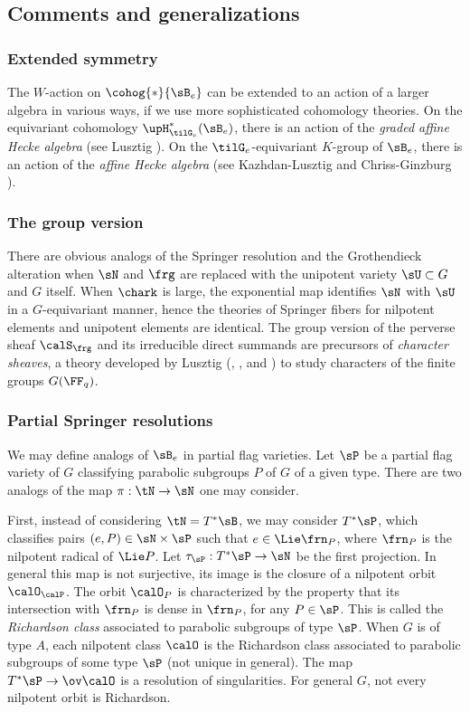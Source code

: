 \subsection{Comments and generalizations} 

\subsubsection{Extended symmetry} The $W$-action on $\cohog{*}{\sB_{e}}$ can be extended to an action of a larger algebra in various ways, if we use more sophisticated cohomology theories. On the equivariant cohomology $\upH^{*}_{\tilG_{e}}(\sB_{e})$, there is an action of the {\em graded affine Hecke algebra} (see Lusztig \cite{LuGrHk}). On the $\tilG_{e}$-equivariant $K$-group of $\sB_{e}$, there is an action of the {\em affine Hecke algebra} (see Kazhdan-Lusztig \cite{KLAffHk} and Chriss-Ginzburg \cite{CG}). 

\subsubsection{The group version} There are obvious analogs of the Springer resolution and the Grothendieck alteration when $\sN$ and $\frg$ are replaced with the unipotent variety $\sU\subset G$ and $G$ itself. When $\chark$ is large, the exponential map identifies $\sN$ with $\sU$ in a $G$-equivariant manner, hence the theories of Springer fibers for nilpotent elements and unipotent elements are identical. The group version of the perverse sheaf $\calS_{\frg}$ and its irreducible direct summands are precursors of {\em character sheaves}, a theory developed by Lusztig (\cite{LuChShI}, \cite{LuChShII}, \cite{LuChShIV} and \cite{LuChShV}) to study characters of the finite groups  $G(\FF_{q})$.

\subsubsection{Partial Springer resolutions}\label{sss:partial Spr} We may define analogs of $\sB_{e}$ in partial flag varieties.  Let $\sP$ be a partial flag variety of $G$ classifying parabolic subgroups $P$ of $G$ of a given type. There are two analogs of the map $\pi:\tN\to\sN$ one may consider. 

First,  instead of considering $\tN=T^{*}\sB$, we may consider $T^{*}\sP$, which classifies pairs $(e, P)\in\sN\times\sP$ such that $e\in \Lie\frn_{P}$, where $\frn_{P}$ is the nilpotent radical of $\Lie P$. Let $\tau_{\sP}: T^{*}\sP\to\sN$ be the first projection. In general this map is not surjective, its image is the closure of a nilpotent orbit $\calO_{\calP}$. The orbit $\calO_{P}$ is characterized by the property that its intersection with $\frn_{P}$ is dense in $\frn_{P}$, for any $P\in\sP$. This is called the {\em Richardson class} associated to parabolic subgroups of type $\sP$. When $G$ is of type $A$, each nilpotent class $\calO$ is the Richardson class associated to parabolic subgroups of some type $\sP$ (not unique in general). The map $T^{*}\sP\to \ov\calO$ is a resolution of singularities. For general $G$, not every nilpotent orbit is Richardson.

